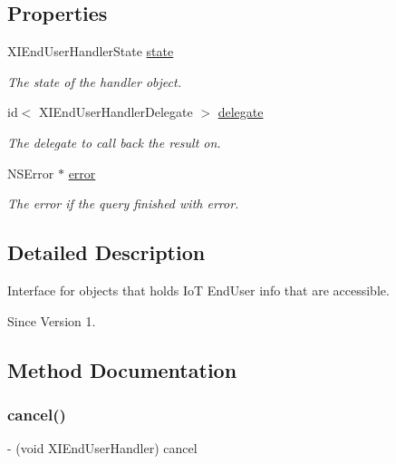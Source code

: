 \subsection*{Properties}
\begin{DoxyCompactItemize}
\item 
X\+I\+End\+User\+Handler\+State \hyperlink{protocol_x_i_end_user_handler_01-p_a6a1286cca57fb37d1de44fc55446df6d}{state}
\begin{DoxyCompactList}\small\item\em The state of the handler object. \end{DoxyCompactList}\item 
id$<$ X\+I\+End\+User\+Handler\+Delegate $>$ \hyperlink{protocol_x_i_end_user_handler_01-p_a38588dbfe6280be2eed34e608014254a}{delegate}
\begin{DoxyCompactList}\small\item\em The delegate to call back the result on. \end{DoxyCompactList}\item 
N\+S\+Error $\ast$ \hyperlink{protocol_x_i_end_user_handler_01-p_aaf0dc6bc3975d900542b83e8610b7450}{error}
\begin{DoxyCompactList}\small\item\em The error if the query finished with error. \end{DoxyCompactList}\end{DoxyCompactItemize}


\subsection{Detailed Description}
Interface for objects that holds IoT End\+User info that are accessible. 

\begin{DoxySince}{Since}
Version 1. 
\end{DoxySince}


\subsection{Method Documentation}
\hypertarget{protocol_x_i_end_user_handler_01-p_ade5d51576841aee618b7e573dc889907}{}\label{protocol_x_i_end_user_handler_01-p_ade5d51576841aee618b7e573dc889907} 
\subsubsection{\texorpdfstring{cancel()}{cancel()}}
{\footnotesize\ttfamily -\/ (void X\+I\+End\+User\+Handler) cancel \begin{DoxyParamCaption}{ }\end{DoxyParamCaption}}



